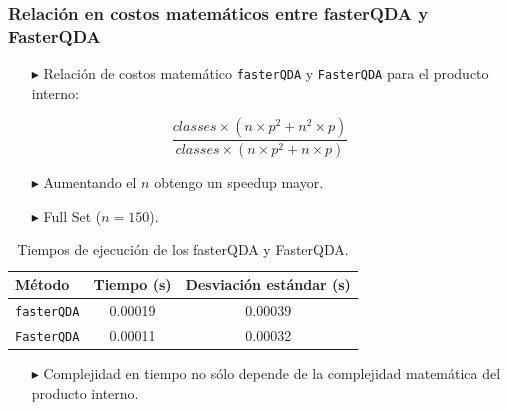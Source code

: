 \begin{frame}[fragile]
    \frametitle{Relación en costos matemáticos entre fasterQDA y FasterQDA}
  \begin{itemize}
    \item[$\blacktriangleright$] Relación de costos matemático \texttt{fasterQDA} y \texttt{FasterQDA} para el producto interno:
  \end{itemize}
  
  \[
    \frac{classes \times (n \times p^2 + n^2 \times p)}{classes \times (n \times p^2 + n \times p)}
  \]

  \begin{itemize}
    \item[$\blacktriangleright$] Aumentando el $n$ obtengo un speedup mayor.

    \item[$\blacktriangleright$] Full Set ($n=150$).
  \end{itemize}

  \begin{table}[h!]
      \centering
      \begin{tabular}{@{}lcc@{}}
        \toprule
        \textbf{Método}      & Tiempo (s)           & Desviación estándar (s) \\ 
        \midrule
        \texttt{fasterQDA}   & 0.00019              & 0.00039                 \\ 
        \texttt{FasterQDA}   & 0.00011              & 0.00032                 \\ 
        \bottomrule
      \end{tabular}
      \caption{Tiempos de ejecución de los fasterQDA y FasterQDA.}
  \end{table}
  \begin{itemize}
    \item[$\blacktriangleright$] Complejidad en tiempo no sólo depende de la complejidad matemática del producto interno.
  \end{itemize}

\end{frame}

